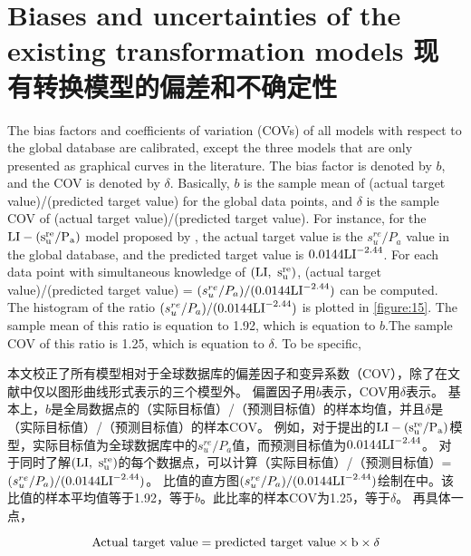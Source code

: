 \section{Biases and uncertainties of the existing transformation models 现有转换模型的偏差和不确定性}

\begin{paracol}{2}
    
    The bias factors and coefficients of variation (COVs) of all models with respect to the global database are calibrated, except the three models that are only presented as graphical curves in the literature. The bias factor is denoted by $b$, and the COV is denoted by $\delta$. Basically, $b$ is the sample mean of (actual target value)/(predicted target value) for the global data points, and $\delta$ is the sample COV of (actual target value)/(predicted target value). For instance, for the $\rm{LI}-(s_u^{re}/P_a)$ model proposed by \citet{Locat1988799}, the actual target value is the $s_u^{re}/P_a$ value in the global database, and the predicted target value is $0.0144\rm{LI}^{-2.44}$. For each data point with simultaneous knowledge of $(\rm{LI},~s_u^{re})$, (actual target value)/(predicted target value) = $(s_u^{re}/P_a)/(0.0144\rm{LI}^{-2.44})$ can be computed. The histogram of the ratio $(s_u^{re}/P_a)/(0.0144\rm{LI}^{-2.44})$ is plotted in \autoref{figure:15}. The sample mean of this ratio is equation to 1.92, which is equation to $b$.The sample COV of this ratio is 1.25, which is  equation to $\delta$. To be specific,
    
    \switchcolumn
    
    本文校正了所有模型相对于全球数据库的偏差因子和变异系数（COV），除了在文献中仅以图形曲线形式表示的三个模型外。 偏置因子用$b$表示，COV用$\delta$表示。 基本上，$b$是全局数据点的（实际目标值）/（预测目标值）的样本均值，并且$\delta$是（实际目标值）/（预测目标值）的样本COV。 例如，对于\citet{Locat1988799}提出的$\rm{LI}-(s_u^{re}/P_a)$模型，实际目标值为全球数据库中的$s_u^{re}/P_a$值，而预测目标值为$0.0144\rm{LI}^{-2.44}$。 对于同时了解$(\rm{LI},~s_u^{re})$的每个数据点，可以计算（实际目标值）/（预测目标值）= $(s_u^{re}/P_a)/(0.0144\rm{LI}^{-2.44})$。 比值的直方图$(s_u^{re}/P_a)/(0.0144\rm{LI}^{-2.44})$绘制在中。该比值的样本平均值等于1.92，等于$b$。此比率的样本COV为1.25，等于$\delta$。 再具体一点，
\end{paracol}

\begin{equation}
    \rm{Actual~ target~value = predicted~target~value\times{}b\times{}\delta}
    \label{equation:1}
\end{equation}


